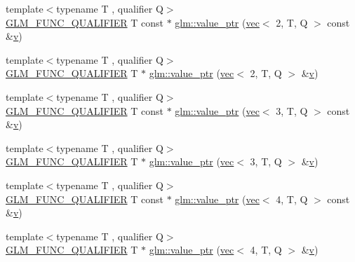 \begin{DoxyCompactItemize}
\item 
{\footnotesize template$<$typename T , qualifier Q$>$ }\\\hyperlink{setup_8hpp_a33fdea6f91c5f834105f7415e2a64407}{G\+L\+M\+\_\+\+F\+U\+N\+C\+\_\+\+Q\+U\+A\+L\+I\+F\+I\+ER} T const  $\ast$ \hyperlink{group__gtc__type__ptr_gaa39964028a0cfbcd18549e33feea7357}{glm\+::value\+\_\+ptr} (\hyperlink{structglm_1_1vec}{vec}$<$ 2, T, Q $>$ const \&\hyperlink{_s_d_l__opengl_8h_a10a82eabcb59d2fcd74acee063775f90}{v})
\item 
{\footnotesize template$<$typename T , qualifier Q$>$ }\\\hyperlink{setup_8hpp_a33fdea6f91c5f834105f7415e2a64407}{G\+L\+M\+\_\+\+F\+U\+N\+C\+\_\+\+Q\+U\+A\+L\+I\+F\+I\+ER} T $\ast$ \hyperlink{group__gtc__type__ptr_ga54d4e779df698b9d951378dc0de5149d}{glm\+::value\+\_\+ptr} (\hyperlink{structglm_1_1vec}{vec}$<$ 2, T, Q $>$ \&\hyperlink{_s_d_l__opengl_8h_a10a82eabcb59d2fcd74acee063775f90}{v})
\item 
{\footnotesize template$<$typename T , qualifier Q$>$ }\\\hyperlink{setup_8hpp_a33fdea6f91c5f834105f7415e2a64407}{G\+L\+M\+\_\+\+F\+U\+N\+C\+\_\+\+Q\+U\+A\+L\+I\+F\+I\+ER} T const  $\ast$ \hyperlink{group__gtc__type__ptr_ga1b0d55a139927496b86be0e2948279a8}{glm\+::value\+\_\+ptr} (\hyperlink{structglm_1_1vec}{vec}$<$ 3, T, Q $>$ const \&\hyperlink{_s_d_l__opengl_8h_a10a82eabcb59d2fcd74acee063775f90}{v})
\item 
{\footnotesize template$<$typename T , qualifier Q$>$ }\\\hyperlink{setup_8hpp_a33fdea6f91c5f834105f7415e2a64407}{G\+L\+M\+\_\+\+F\+U\+N\+C\+\_\+\+Q\+U\+A\+L\+I\+F\+I\+ER} T $\ast$ \hyperlink{group__gtc__type__ptr_gabca52e90fd530ff2e8344d3f66326ccd}{glm\+::value\+\_\+ptr} (\hyperlink{structglm_1_1vec}{vec}$<$ 3, T, Q $>$ \&\hyperlink{_s_d_l__opengl_8h_a10a82eabcb59d2fcd74acee063775f90}{v})
\item 
{\footnotesize template$<$typename T , qualifier Q$>$ }\\\hyperlink{setup_8hpp_a33fdea6f91c5f834105f7415e2a64407}{G\+L\+M\+\_\+\+F\+U\+N\+C\+\_\+\+Q\+U\+A\+L\+I\+F\+I\+ER} T const  $\ast$ \hyperlink{group__gtc__type__ptr_gace63685baa09872656962c2695900c48}{glm\+::value\+\_\+ptr} (\hyperlink{structglm_1_1vec}{vec}$<$ 4, T, Q $>$ const \&\hyperlink{_s_d_l__opengl_8h_a10a82eabcb59d2fcd74acee063775f90}{v})
\item 
{\footnotesize template$<$typename T , qualifier Q$>$ }\\\hyperlink{setup_8hpp_a33fdea6f91c5f834105f7415e2a64407}{G\+L\+M\+\_\+\+F\+U\+N\+C\+\_\+\+Q\+U\+A\+L\+I\+F\+I\+ER} T $\ast$ \hyperlink{group__gtc__type__ptr_gae0ad6ab684abf10a87cadb95a9137fa2}{glm\+::value\+\_\+ptr} (\hyperlink{structglm_1_1vec}{vec}$<$ 4, T, Q $>$ \&\hyperlink{_s_d_l__opengl_8h_a10a82eabcb59d2fcd74acee063775f90}{v})

\end{DoxyCompactItemize}

